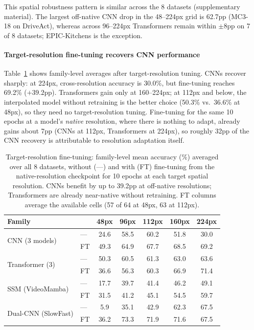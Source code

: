 \documentclass[a4paper, 10pt, conference]{ieeeconf}
\newcommand{\tabtight}{\setlength{\tabcolsep}{3.5pt}\renewcommand{\arraystretch}{1.10}}
\begin{document}
This spatial robustness pattern is similar across the 8 datasets (supplementary material). The largest off-native CNN drop in the 48--224px grid is 62.7pp (MC3-18 on DriveAct), whereas across 96--224px Transformers remain within $\pm$8pp on 7 of 8 datasets; EPIC-Kitchens is the exception.

\paragraph{Target-resolution fine-tuning recovers CNN performance}
Table~\ref{tab:p3} shows family-level averages after target-resolution tuning. CNNs recover sharply: at 224px, cross-resolution accuracy is 30.0\%, but fine-tuning reaches 69.2\% ($+39.2$pp). Transformers gain only at 160--224px; at 112px and below, the interpolated model without retraining is the better choice (50.3\% vs.\ 36.6\% at 48px), so they need no target-resolution tuning. Fine-tuning for the same 10 epochs at a model's \emph{native} resolution, where there is nothing to adapt, already gains about 7pp (CNNs at 112px, Transformers at 224px), so roughly 32pp of the CNN recovery is attributable to resolution adaptation itself.

\begin{table}[t]
\centering
\caption{Target-resolution fine-tuning: family-level mean accuracy (\%) averaged over all 8 datasets, without (---) and with (FT) fine-tuning from the native-resolution checkpoint for 10 epochs at each target spatial resolution. CNNs benefit by up to 39.2pp at off-native resolutions; Transformers are already near-native without retraining. FT columns average the available cells (57 of 64 at 48px, 63 at 112px).}
\label{tab:p3}
\scriptsize\tabtight
\begin{tabular}{l l ccccc}
\toprule
Family & & 48px & 96px & 112px & 160px & 224px \\
\midrule
\multirow{2}{*}{CNN (3 models)}      & --- & 24.6 & 58.5 & 60.2 & 51.8 & 30.0 \\
                                     & FT  & 49.3 & 64.9 & 67.7 & 68.5 & 69.2 \\
\midrule
\multirow{2}{*}{Transformer (3)}     & --- & 50.3 & 60.5 & 61.3 & 63.0 & 63.6 \\
                                     & FT  & 36.6 & 56.3 & 60.3 & 66.9 & 71.4 \\
\midrule
\multirow{2}{*}{SSM (VideoMamba)}    & --- & 17.7 & 39.7 & 41.4 & 46.2 & 49.1 \\
                                     & FT  & 31.5 & 41.2 & 45.1 & 54.5 & 59.7 \\
\midrule
\multirow{2}{*}{Dual-CNN (SlowFast)} & --- &  5.9 & 35.1 & 42.9 & 62.3 & 67.5 \\
                                     & FT  & 36.2 & 73.3 & 71.9 & 71.6 & 67.5 \\
\bottomrule
\end{tabular}
\end{table}
\end{document}
